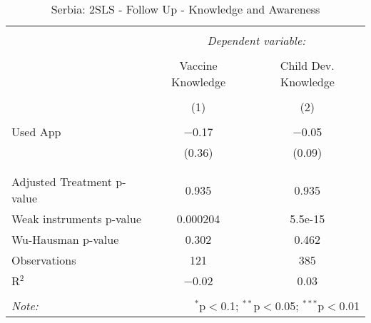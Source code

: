 
\begin{table}[!htbp] \centering 
  \caption{Serbia: 2SLS - Follow Up - Knowledge and Awareness} 
  \label{tbl:Serbia: 2SLS - Follow Up - Knowledge and Awareness} 
\begin{tabular}{@{\extracolsep{5pt}}lcc} 
\\[-1.8ex]\hline 
\hline \\[-1.8ex] 
 & \multicolumn{2}{c}{\textit{Dependent variable:}} \\ 
\cline{2-3} 
\\[-1.8ex] & Vaccine Knowledge & Child Dev. Knowledge \\ 
\\[-1.8ex] & (1) & (2)\\ 
\hline \\[-1.8ex] 
 Used App & $-$0.17 & $-$0.05 \\ 
  & (0.36) & (0.09) \\ 
  & & \\ 
\hline \\[-1.8ex] 
Adjusted Treatment p-value & 0.935 & 0.935 \\ 
Weak instruments p-value & 0.000204 & 5.5e-15 \\ 
Wu-Hausman p-value & 0.302 & 0.462 \\ 
Observations & 121 & 385 \\ 
R$^{2}$ & $-$0.02 & 0.03 \\ 
\hline 
\hline \\[-1.8ex] 
\textit{Note:}  & \multicolumn{2}{r}{$^{*}$p$<$0.1; $^{**}$p$<$0.05; $^{***}$p$<$0.01} \\ 
\end{tabular} 
\end{table} 
